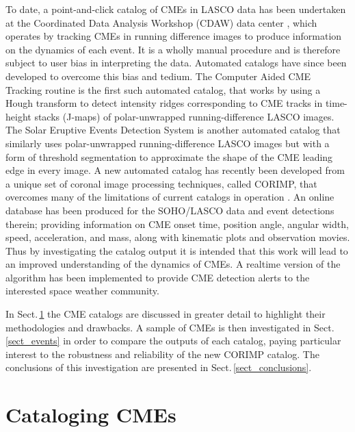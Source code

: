 \documentclass[referee,a4paper,12pt,traditabstract]{swsc}
\begin{document}
\begin{linenumbers}
To date, a point-and-click catalog of CMEs in LASCO data has been undertaken at the Coordinated Data Analysis Workshop (CDAW) data center \citep{2009EM&P..104..295G}, which operates by tracking CMEs in running difference images to produce information on the dynamics of each event. It is a wholly manual procedure and is therefore subject to user bias in interpreting the data. Automated catalogs have since been developed to overcome this bias and tedium. The Computer Aided CME Tracking routine \cite[CACTUS;][]{2004A&A...425.1097R} is the first such automated catalog, that works by using a Hough transform to detect intensity ridges corresponding to CME tracks in time-height stacks (J-maps) of polar-unwrapped running-difference LASCO images. The Solar Eruptive Events Detection System \cite[SEEDS;][]{2008SoPh..248..485O} is another automated catalog that similarly uses polar-unwrapped running-difference LASCO images but with a form of threshold segmentation to approximate the shape of the CME leading edge in every image. A new automated catalog has recently been developed from a unique set of coronal image processing techniques, called CORIMP, that overcomes many of the limitations of current catalogs in operation \citep{2012ApJ...752..144M,2012ApJ...752..145B}. An online database has been produced for the SOHO/LASCO data and event detections therein; providing information on CME onset time, position angle, angular width, speed, acceleration, and mass, along with kinematic plots and observation movies. Thus by investigating the catalog output it is intended that this work will lead to an improved understanding of the dynamics of CMEs. A realtime version of the algorithm has been implemented to provide CME detection alerts to the interested space weather community.

In Sect.\,\ref{sect_catalogs} the CME catalogs are discussed in greater detail to highlight their methodologies and drawbacks. A sample of CMEs is then investigated in Sect.\,\ref{sect_events} in order to compare the outputs of each catalog, paying particular interest to the robustness and reliability of the new CORIMP catalog. The conclusions of this investigation are presented in Sect.\,\ref{sect_conclusions}.

\section{Cataloging CMEs}
\label{sect_catalogs}


\end{linenumbers}
\end{document}
